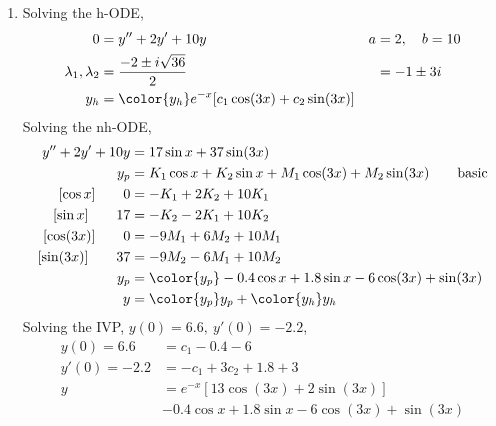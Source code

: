 \begin{enumerate}
    \item Solving the h-ODE,
          \begin{align}
              0                        & = y'' + 2y' + 10y                  &
              a                        & = 2, \quad b = 10                    \\
              \lambda_{1}, \lambda_{2} & = \frac{-2 \pm i\sqrt{36}}{2}      &
                                       & = -1 \pm 3i                          \\
              y_{h}                    & = \color{y_h} e^{-x}[c_{1}\cos(3x)
                      + c_{2}\sin(3x)]
          \end{align}
          Solving the nh-ODE,
          \begin{align}
              y'' + 2y' + 10y      & = 17\sin x + 37\sin(3x)                     \\
              y_{p}                & = K_{1}\cos x + K_{2}\sin x + M_{1}\cos(3x)
              + M_{2}\sin(3x) \qquad \text{basic}                                \\
              [\cos x] \qquad 0    & = -K_{1} + 2K_{2} + 10K_{1}                 \\
              [\sin x] \qquad 17   & = -K_{2} - 2K_{1} + 10K_{2}                 \\
              [\cos(3x)] \qquad 0  & = -9M_{1} + 6M_{2} + 10M_{1}                \\
              [\sin(3x)] \qquad 37 & = -9M_{2} - 6M_{1} + 10M_{2}                \\
              y_{p}                & = \color{y_p} -0.4\cos x + 1.8\sin x
              - 6\cos(3x) + \sin(3x)                                             \\
              y                    & = {\color{y_p} y_{p}} + {\color{y_h} y_{h}}
          \end{align}
          Solving the IVP, $ y(0) = 6.6,\ y'(0) = -2.2 $,
          \begin{align}
              y(0) = 6.6   & = c_{1} - 0.4 - 6                             \\
              y'(0) = -2.2 & = -c_{1} + 3c_{2} + 1.8 + 3                   \\
              y            & = e^{-x}[13 \cos(3x) + 2\sin(3x)]             \\
                           & -0.4\cos x + 1.8\sin x - 6\cos(3x) + \sin(3x)
          \end{align}


\end{enumerate}
